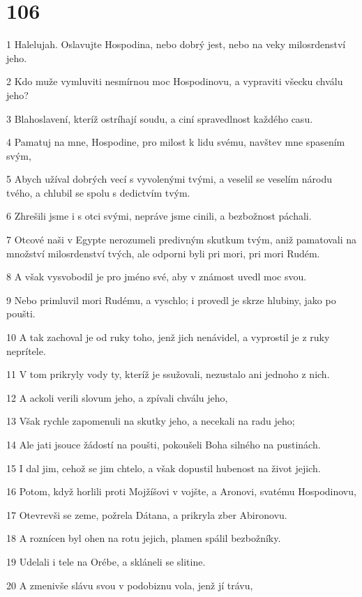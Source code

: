 \chapter{106}

\par 1 Halelujah. Oslavujte Hospodina, nebo dobrý jest, nebo na veky milosrdenství jeho.
\par 2 Kdo muže vymluviti nesmírnou moc Hospodinovu, a vypraviti všecku chválu jeho?
\par 3 Blahoslavení, kteríž ostríhají soudu, a ciní spravedlnost každého casu.
\par 4 Pamatuj na mne, Hospodine, pro milost k lidu svému, navštev mne spasením svým,
\par 5 Abych užíval dobrých vecí s vyvolenými tvými, a veselil se veselím národu tvého, a chlubil se spolu s dedictvím tvým.
\par 6 Zhrešili jsme i s otci svými, nepráve jsme cinili, a bezbožnost páchali.
\par 7 Otcové naši v Egypte nerozumeli predivným skutkum tvým, aniž pamatovali na množství milosrdenství tvých, ale odporni byli pri mori, pri mori Rudém.
\par 8 A však vysvobodil je pro jméno své, aby v známost uvedl moc svou.
\par 9 Nebo primluvil mori Rudému, a vyschlo; i provedl je skrze hlubiny, jako po poušti.
\par 10 A tak zachoval je od ruky toho, jenž jich nenávidel, a vyprostil je z ruky neprítele.
\par 11 V tom prikryly vody ty, kteríž je ssužovali, nezustalo ani jednoho z nich.
\par 12 A ackoli verili slovum jeho, a zpívali chválu jeho,
\par 13 Však rychle zapomenuli na skutky jeho, a necekali na radu jeho;
\par 14 Ale jati jsouce žádostí na poušti, pokoušeli Boha silného na pustinách.
\par 15 I dal jim, cehož se jim chtelo, a však dopustil hubenost na život jejich.
\par 16 Potom, když horlili proti Mojžíšovi v vojšte, a Aronovi, svatému Hospodinovu,
\par 17 Otevrevši se zeme, požrela Dátana, a prikryla zber Abironovu.
\par 18 A roznícen byl ohen na rotu jejich, plamen spálil bezbožníky.
\par 19 Udelali i tele na Orébe, a skláneli se slitine.
\par 20 A zmenivše slávu svou v podobiznu vola, jenž jí trávu,
